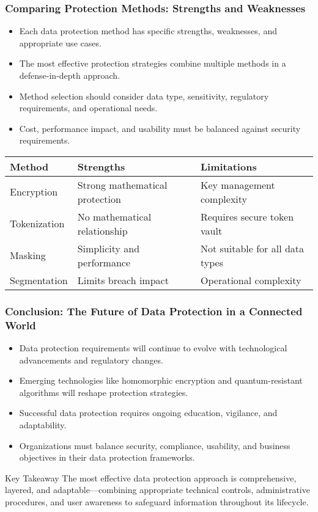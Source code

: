 \documentclass{beamer}
\begin{document}
    \begin{frame}
    \frametitle{Comparing Protection Methods: Strengths and Weaknesses}
    \begin{itemize}
        \item Each data protection method has specific strengths, weaknesses, and appropriate use cases.
        \item The most effective protection strategies combine multiple methods in a defense-in-depth approach.
        \item Method selection should consider data type, sensitivity, regulatory requirements, and operational needs.
        \item Cost, performance impact, and usability must be balanced against security requirements.
    \end{itemize}
    
    \small
    \begin{table}
    \begin{tabular}{|l|l|l|}
    \hline
    \textbf{Method} & \textbf{Strengths} & \textbf{Limitations} \\
    \hline
    Encryption & Strong mathematical protection & Key management complexity \\
    \hline
    Tokenization & No mathematical relationship & Requires secure token vault \\
    \hline
    Masking & Simplicity and performance & Not suitable for all data types \\
    \hline
    Segmentation & Limits breach impact & Operational complexity \\
    \hline
    \end{tabular}
    \end{table}
    \end{frame}
    
    \begin{frame}
    \frametitle{Conclusion: The Future of Data Protection in a Connected World}
    \begin{itemize}
        \item Data protection requirements will continue to evolve with technological advancements and regulatory changes.
        \item Emerging technologies like homomorphic encryption and quantum-resistant algorithms will reshape protection strategies.
        \item Successful data protection requires ongoing education, vigilance, and adaptability.
        \item Organizations must balance security, compliance, usability, and business objectives in their data protection frameworks.
    \end{itemize}
    
    \begin{alertblock}{Key Takeaway}
    The most effective data protection approach is comprehensive, layered, and adaptable—combining appropriate technical controls, administrative procedures, and user awareness to safeguard information throughout its lifecycle.
    \end{alertblock}
    \end{frame}
    
    
\end{document}

